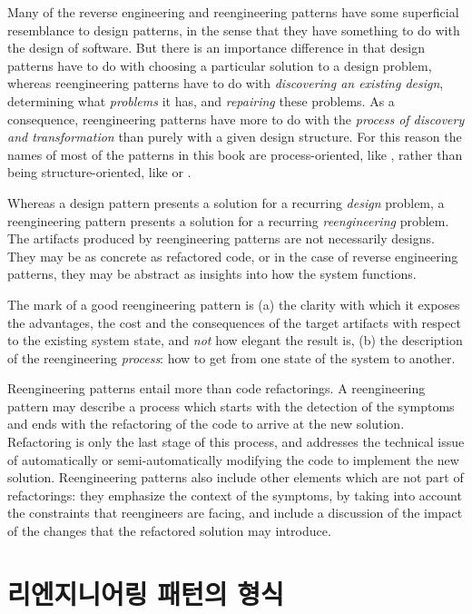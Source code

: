 \documentclass[a4paper,10pt,twoside]{book}
\begin{document}
Many of the reverse engineering and reengineering patterns have some superficial resemblance to design patterns, in the sense that they have something to do with the design of software. But there is an importance difference in that design patterns have to do with choosing a particular solution to a design problem, whereas reengineering patterns have to do with \emph{discovering an existing design}, determining what \emph{problems} it has, and \emph{repairing} these problems. As a consequence, reengineering patterns have more to do with the \emph{process of discovery and transformation} than purely with a given design structure. For this reason the names of most of the patterns in this book are process-oriented, like , rather than being structure-oriented, like  or . 

Whereas a design pattern presents a solution for a recurring \emph{design} problem, a reengineering pattern presents a solution for a recurring \emph{reengineering} problem. The artifacts produced by reengineering patterns are not necessarily designs. They may be as concrete as refactored code, or in the case of reverse engineering patterns, they may be abstract as insights into how the system functions.

The mark of a good reengineering pattern is (a) the clarity with which it exposes the advantages, the cost and the consequences of the target artifacts with respect to the existing system state, and \emph{not} how elegant the result is, (b) the description of the reengineering \emph{process}: how to get from one state of the system to another.

Reengineering patterns entail more than code refactorings. A reengineering pattern may describe a process which starts with the detection of the symptoms and ends with the refactoring of the code to arrive at the new solution. Refactoring is only the last stage of this process, and addresses the technical issue of automatically or semi-automatically modifying the code to implement the new solution. Reengineering patterns also include other elements which are not part of refactorings: they emphasize the context of the symptoms, by taking into account the constraints that reengineers are facing, and include a discussion of the impact of the changes that the refactored solution may introduce. 

\section{리엔지니어링 패턴의 형식}
\end{document}
